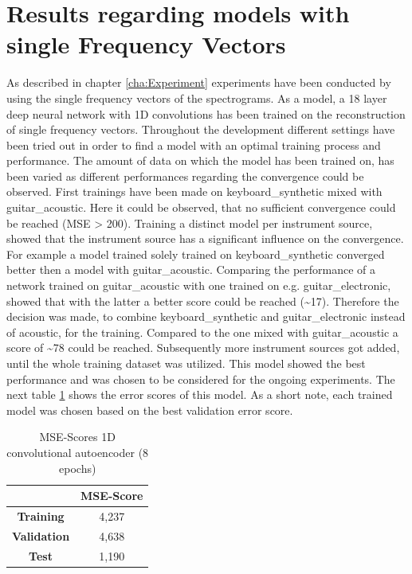 \section{Results regarding models with single Frequency Vectors}
As described in chapter \ref{cha:Experiment} experiments have been conducted by using the single frequency vectors of the spectrograms. As a model, a 18 layer deep neural network with 1D convolutions has been trained on the reconstruction of single frequency vectors. 
Throughout the development different settings have been tried out in order to find a model with an optimal training process and performance. The amount of data on which the model has been trained on, has been varied as different performances regarding the convergence could be observed. First trainings have been made on keyboard\_synthetic mixed with guitar\_acoustic. Here it could be observed, that no sufficient convergence could be reached (MSE > 200). Training a distinct model per instrument source, showed that the instrument source has a significant influence on the convergence. For example a model trained solely trained on keyboard\_synthetic converged better then a model with guitar\_acoustic. Comparing the performance of a network trained on guitar\_acoustic with one trained on e.g. guitar\_electronic, showed that with the latter a better score could be reached (\textasciitilde 17). Therefore the decision was made, to combine keyboard\_synthetic and guitar\_electronic instead of acoustic, for the training. Compared to the one mixed with guitar\_acoustic a score of \textasciitilde 78 could be reached. Subsequently more instrument sources got added, until the whole training dataset was utilized. This model showed the best performance and was chosen to be considered for the ongoing experiments. The next table \ref{tab:res_scores_1Dcae} shows the error scores of this model. As a short note, each trained model was chosen based on the best validation error score. 

\begin{table}[htb!]
    \centering
    \begin{tabular}{|c|c|}
        \hline
         & \textbf{MSE-Score} \\
         \hline
        \textbf{Training} & 4,237 \\
        \hline
        \textbf{Validation} & 4,638 \\
        \hline
        \textbf{Test} & 1,190 \\
        \hline
    \end{tabular}
    \caption{MSE-Scores 1D convolutional autoencoder (8 epochs)}
    \label{tab:res_scores_1Dcae}
\end{table}

